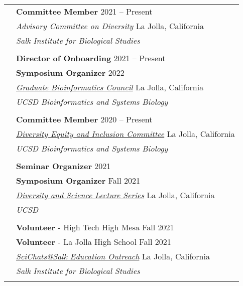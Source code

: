 \documentclass[letterpaper, 11pt]{article}
\begin{document}
\begin{longtable}{p{1.6in}p{4.9in}}

{\color{OliveGreen}{Service / Outreach}}
& \textbf{Committee Member} \hfill 2021 -- Present \\
& \textit{Advisory Committee on Diversity} \hfill La Jolla, California \\
& \textit{Salk Institute for Biological Studies} \\
& \\

& \textbf{Director of Onboarding} \hfill 2021 -- Present \\
& \textbf{Symposium Organizer} \hfill 2022 \\
& \href{https://gbic.ucsd.edu/}{\textit{Graduate Bioinformatics Council}} \hfill La Jolla, California \\
& \textit{UCSD Bioinformatics and Systems Biology} \\
& \\

& \textbf{Committee Member} \hfill 2020 -- Present \\
& \href{https://bioinformatics.ucsd.edu/node/19020}{\textit{Diversity Equity and Inclusion Committee}} \hfill La Jolla, California \\
& \textit{UCSD Bioinformatics and Systems Biology} \\
& \\

& \textbf{Seminar Organizer} \hfill 2021 \\
& \textbf{Symposium Organizer} \hfill Fall 2021 \\
& \href{https://www.ucsddasl.com/about}{\textit{Diversity and Science Lecture Series}} \hfill La Jolla, California \\
& \textit{UCSD} \\
& \\

& \textbf{Volunteer} - High Tech High Mesa \hfill Fall 2021 \\
& \textbf{Volunteer} - La Jolla High School \hfill Fall 2021 \\
& \href{https://www.salk.edu/about/education-outreach/volunteer-opportunities/scichatssalk/}{\textit{SciChats@Salk Education Outreach}} \hfill La Jolla, California \\
& \textit{Salk Institute for Biological Studies} \\
& \\


\end{longtable}
\end{document}
